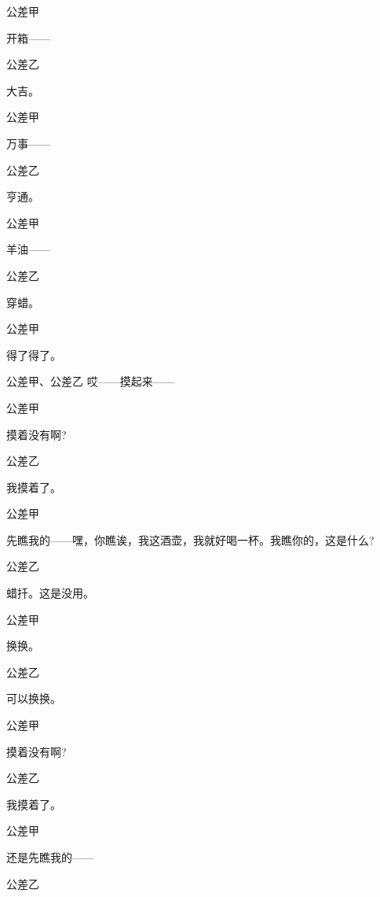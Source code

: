 公差甲\hspace{20pt}~

开箱------

公差乙\hspace{20pt}~

大吉。

公差甲\hspace{20pt}~

万事------

公差乙\hspace{20pt}~

亨通。

公差甲\hspace{20pt}~

羊油------

公差乙\hspace{20pt}~

穿蜡。

公差甲\hspace{20pt}~

得了得了。

公差甲、公差乙 哎------摸起来------

公差甲\hspace{20pt}~

摸着没有啊?

公差乙\hspace{20pt}~

我摸着了。

公差甲

先瞧我的------嘿，你瞧诶，我这酒壶，我就好喝一杯。我瞧你的，这是什么?

公差乙\hspace{20pt}~

蜡扦。这是没用。

公差甲\hspace{20pt}~

换换。

公差乙\hspace{20pt}~

可以换换。

公差甲\hspace{20pt}~

摸着没有啊?

公差乙\hspace{20pt}~

我摸着了。

公差甲\hspace{20pt}~

还是先瞧我的------

公差乙\hspace{20pt}~

